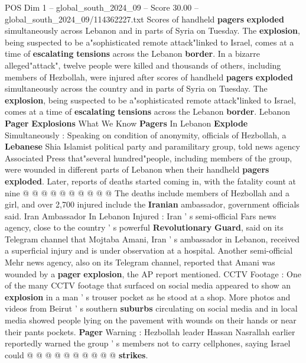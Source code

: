 \begin{textsample}{POS Dim 1 – global\_south\_2024\_09 – Score 30.00 – global\_south\_2024\_09/114362227.txt}  \label{ex:f1_pos_038}
Scores of handheld \textbf{pagers} \textbf{exploded} simultaneously across Lebanon and in parts of Syria on Tuesday.
The \textbf{explosion}, being suspected to be a"sophisticated remote attack"linked to Israel, comes at a time of \textbf{escalating} \textbf{tensions} across the Lebanon \textbf{border}.
In a bizarre alleged"attack", twelve people were killed and thousands of others, including members of Hezbollah, were injured after scores of handheld \textbf{pagers} \textbf{exploded} simultaneously across the country and in parts of Syria on Tuesday.
The \textbf{explosion}, being suspected to be a"sophisticated remote attack"linked to Israel, comes at a time of \textbf{escalating} \textbf{tensions} across the Lebanon \textbf{border}.
Lebanon \textbf{Pager} \textbf{Explosions} What We Know \textbf{Pagers} In Lebanon \textbf{Explode} Simultaneously : Speaking on condition of anonymity, officials of Hezbollah, a \textbf{Lebanese} Shia Islamist political party and paramilitary group, told news agency Associated Press that"several hundred"people, including members of the group, were wounded in different parts of Lebanon when their handheld \textbf{pagers} \textbf{exploded}.
Later, reports of deaths started coming in, with the fatality count at nine @ @ @ @ @ @ @ @ @ @ The deaths include members of Hezbollah and a girl, and over 2,700 injured include the \textbf{Iranian} ambassador, government officials said.
Iran Ambassador In Lebanon Injured : Iran ' s semi-official Fars news agency, close to the country ' s powerful \textbf{Revolutionary} \textbf{Guard}, said on its Telegram channel that Mojtaba Amani, Iran ' s ambassador in Lebanon, received a superficial injury and is under observation at a hospital.
Another semi-official Mehr news agency, also on its Telegram channel, reported that Amani was wounded by a \textbf{pager} \textbf{explosion}, the AP report mentioned.
CCTV Footage : One of the many CCTV footage that surfaced on social media appeared to show an \textbf{explosion} in a man ' s trouser pocket as he stood at a shop.
More photos and videos from Beirut ' s southern \textbf{suburbs} circulating on social media and in local media showed people lying on the pavement with wounds on their hands or near their pants pockets. \textbf{Pager} Warning : Hezbollah leader Hassan Nasrallah earlier reportedly warned the group ' s members not to carry cellphones, saying Israel could @ @ @ @ @ @ @ @ @ @ \textbf{strikes}.

\end{textsample}
